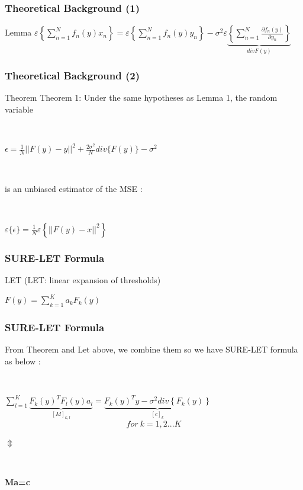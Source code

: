 \documentclass{beamer}
\begin{document}
	\begin{frame}
			\frametitle{Theoretical Background (1)}
	\begin{block}{Lemma}
$\varepsilon\left\{\displaystyle\sum_{n=1}^{N}f_n(y)x_n\right\}=\varepsilon\left\{\displaystyle\sum_{n=1}^{N}f_n(y)y_n\right\}-
\sigma^2\varepsilon\underbrace{\left\{\displaystyle\sum_{n=1}^{N}\frac{\partial f_n(y)}{\partial y_n}\right\}}_{div{F(y)}}$
	\end{block}

\end{frame}
\begin{frame}
	\frametitle{Theoretical Background (2)}
	\begin{block}{Theorem}
	Theorem 1: Under the same hypotheses as Lemma 1, the
	random variable
	
	\
	
	$\epsilon=\frac{1}{N}||F(y)-y||^2 + \frac{2\sigma^2}{N}div\{F(y)\}-\sigma^2$

\

is an unbiased estimator of the MSE :	

\

$\varepsilon\{\epsilon\}=\frac{1}{N}\varepsilon \left\{||F(y)-x||^2\right\}$


\end{block}
\end{frame}	
\begin{frame}
	\frametitle{SURE-LET Formula }
\begin{block}{LET}
(LET: linear expansion of thresholds)

$F(y)=\displaystyle\sum_{k=1}^{K}a_kF_k(y) $
\end{block}


\end{frame}	
	\begin{frame}
		\frametitle{SURE-LET Formula}
		From Theorem and Let above, we combine them so we have SURE-LET formula as below : 	
		
		\

$\displaystyle\sum_{l=1}^{K}\underbrace{F_k(y)^T F_l(y)a_l}_{[M]_{k,l}} = \underbrace{F_k(y)^Ty-\sigma^2div\left\{F_k(y)\right\}}_{[c]_k}$    $$for \ k = 1,2...K$$	
\begin{center}
$\Updownarrow$ \ \ \ \ \ \ \ \ \ \ \ \ \ \ \ \ \ \ \ \ \

\

\textbf{Ma=c} \ \ \ \ \ \ \ \ \ \ \ \ \ \ \ \ \ \ \ \
\end{center}






\end{frame}	
	
\end{document}
